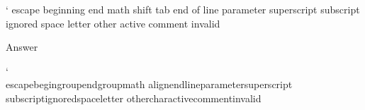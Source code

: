 \def\category#1{\ifcase\catcode#1 escape \or beginning \or end \or math shift \or
tab \or end of line \or parameter \or superscript \or subscript \or ignored \or
space \or letter \or other \or active \or comment \or invalid \fi}

\category`\

Answer

\def\category#1{\ifcase\catcode`#1
escape\or begingroup\or endgroup\or math\or
align\or endline\or parameter\or superscript\or
subscript\or ignored\or space\or letter\or
otherchar\or active\or comment\or invalid\fi}

\category\\


\bye


